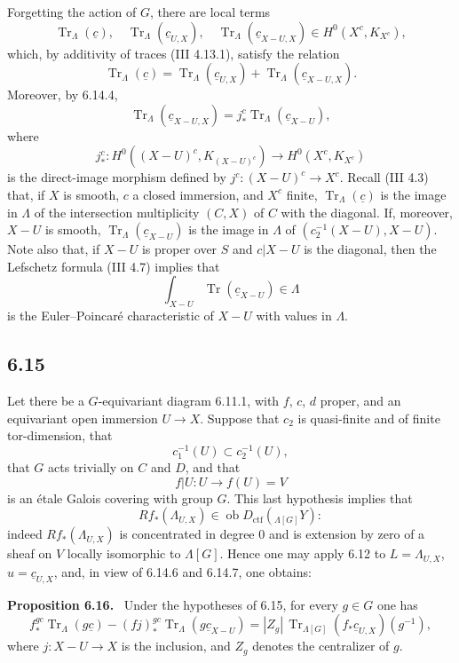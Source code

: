\documentclass[11pt]{article}
\newenvironment{statement}[1]{\par\medskip\noindent\textbf{#1.}\ }{\par\medskip}
\providecommand{\Tr}{\operatorname{Tr}}
\providecommand{\Tr}{\operatorname{Tr}}
\providecommand{\Ob}{\operatorname{ob}}
\providecommand{\Tr}{\operatorname{Tr}}
\providecommand{\Ob}{\operatorname{ob}}
\providecommand{\Tr}{\operatorname{Tr}}
\providecommand{\Ob}{\operatorname{Ob}}
\begin{document}
Forgetting the action of $G$, there are local terms
\begin{equation}
\Tr_{\Lambda}(\underline c),\quad
\Tr_{\Lambda}(\underline c_{U,X}),\quad
\Tr_{\Lambda}(\underline c_{X-U,X})
\in H^0(X^c,K_{X^c}),
\tag{6.14.5}
\end{equation}
which, by additivity of traces (III 4.13.1), satisfy the relation
\begin{equation}
\Tr_{\Lambda}(\underline c)
=
\Tr_{\Lambda}(\underline c_{U,X})
+
\Tr_{\Lambda}(\underline c_{X-U,X}).
\tag{6.14.6}
\end{equation}
Moreover, by 6.14.4,
\begin{equation}
\Tr_{\Lambda}(\underline c_{X-U,X})
=
j_*^c\Tr_{\Lambda}(\underline c_{X-U}),
\tag{6.14.7}
\end{equation}
where
\[
j_*^c:H^0((X-U)^c,K_{(X-U)^c})\longrightarrow H^0(X^c,K_{X^c})
\]
is the direct-image morphism defined by $j^c:(X-U)^c\to X^c$. Recall (III 4.3) that, if $X$ is smooth, $c$ a closed immersion, and $X^c$ finite, $\Tr_{\Lambda}(\underline c)$ is the image in $\Lambda$ of the intersection multiplicity $(C,X)$ of $C$ with the diagonal. If, moreover, $X-U$ is smooth, $\Tr_{\Lambda}(\underline c_{X-U})$ is the image in $\Lambda$ of $(c_2^{-1}(X-U),X-U)$. Note also that, if $X-U$ is proper over $S$ and $c|X-U$ is the diagonal, then the Lefschetz formula (III 4.7) implies that
\[
\int_{X-U}\Tr(\underline c_{X-U})\in\Lambda
\]
is the Euler--Poincaré characteristic of $X-U$ with values in $\Lambda$.

\subsection*{6.15}
Let there be a $G$-equivariant diagram 6.11.1, with $f$, $c$, $d$ proper, and an equivariant open immersion $U\to X$. Suppose that $c_2$ is quasi-finite and of finite tor-dimension, that
\[
c_1^{-1}(U)\subset c_2^{-1}(U),
\]
that $G$ acts trivially on $C$ and $D$, and that
\[
f|U:U\longrightarrow f(U)=V
\]
is an étale Galois covering with group $G$. This last hypothesis implies that
\[
Rf_*(\Lambda_{U,X})\in\Ob D_{\mathrm{ctf}}({}_{\Lambda[G]}Y):
\]
indeed $Rf_*(\Lambda_{U,X})$ is concentrated in degree $0$ and is extension by zero of a sheaf on $V$ locally isomorphic to $\Lambda[G]$. Hence one may apply 6.12 to $L=\Lambda_{U,X}$, $u=\underline c_{U,X}$, and, in view of 6.14.6 and 6.14.7, one obtains:

\begin{statement}{Proposition 6.16}
Under the hypotheses of 6.15, for every $g\in G$ one has
\begin{equation}
f_*^{gc}\Tr_{\Lambda}(g\underline c)
-(fj)_*^{gc}\Tr_{\Lambda}(g\underline c_{X-U})
=
|Z_g|\,\Tr_{\Lambda[G]}(f_*\underline c_{U,X})(g^{-1}),
\tag{6.16.1}
\end{equation}
where $j:X-U\to X$ is the inclusion, and $Z_g$ denotes the centralizer of $g$.
\end{statement}
\end{document}
